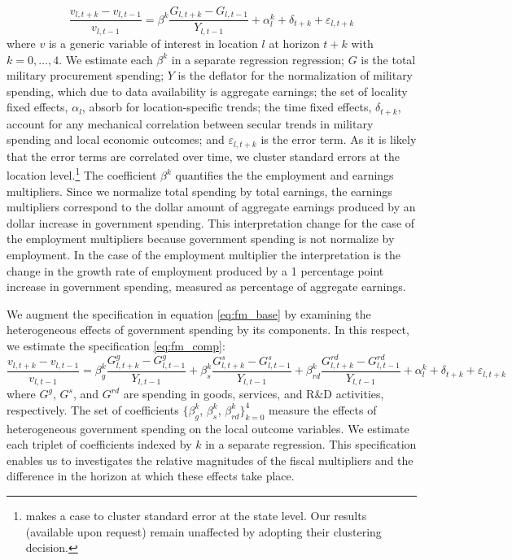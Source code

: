 \documentclass[dv_diss_main.tex]{subfiles}
\begin{document}
\begin{equation}
    \frac{v_{l,t+k} - v_{l,t-1}}{v_{l,t-1}} = \beta^k \frac{G_{l,t+k}-G_{l,t-1}}{Y_{l,t-1}} + \alpha_l^k + \delta_{t+k} + \varepsilon_{l,t+k}
    \label{eq:fm_base}
\end{equation}
where $v$ is a generic variable of interest in location $l$ at horizon $t+k$ with $k = 0, 
\dots, 4$. We estimate each $\beta^k$ in a separate regression regression; $G$ is the total military procurement spending; $Y$ is the deflator for the normalization of military spending, which due to data availability is aggregate earnings; the set of locality fixed effects, $\alpha_l$, absorb for location-specific trends; the time fixed effects, $\delta_{t+k}$, account for any mechanical correlation between secular trends in military spending and local economic outcomes; and $\varepsilon_{l,t+k}$ is the error term. As it is likely that the error terms are correlated over time, we cluster standard errors at the location level.\footnote{ \cite{Auerbach2020} makes a case to cluster standard error at the state level. Our results (available upon request) remain unaffected by adopting their clustering decision.} The coefficient $\beta^k$ quantifies the the employment and earnings multipliers. Since we normalize total spending by total earnings, the earnings multipliers correspond to the dollar amount of aggregate earnings produced by an dollar increase in government spending. This interpretation change for the case of the employment multipliers because government spending is not normalize by employment. In the case of the employment multiplier the interpretation is the change in the growth rate of employment produced by a 1 percentage point increase in government spending, measured as percentage of aggregate earnings. 

We augment the specification in equation \eqref{eq:fm_base} by examining the heterogeneous effects of government spending by its components. In this respect, we estimate the specification \eqref{eq:fm_comp}:
\begin{equation}
    \frac{v_{l,t+k} - v_{l,t-1}}{v_{l,t-1}} = \beta_{g}^k \frac{G^{g}_{l,t+k}-G^{g}_{l,t-1}}{Y_{l,t-1}} + \beta_{s}^k \frac{G^{s}_{l,t+k}-G^{s}_{l,t-1}}{Y_{l,t-1}} + \beta_{rd}^k \frac{G^{rd}_{l,t+k}-G^{rd}_{l,t-1}}{Y_{l,t-1}} + \alpha_l^k + \delta_{t+k} + \varepsilon_{l,t+k}
    \label{eq:fm_comp}
\end{equation}
where $G^{g}$, $G^{s}$, and $G^{rd}$ are spending in goods, services, and R\&D activities, respectively. The set of coefficients $\{\beta_{g}^k$, $\beta_{s}^k$, $\beta_{rd}^k\}_{k=0}^{4}$ measure the effects of heterogeneous government spending on the local outcome variables. We estimate each triplet of coefficients indexed by $k$ in a separate regression.  This specification enables us to investigates the relative magnitudes of the fiscal multipliers and the difference in the horizon at which these effects take place. 
\end{document}
